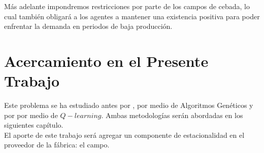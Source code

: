 M\'as adelante impondremos restricciones por parte de los campos de cebada, lo cual tambi\'en obligar\'a a los agentes a mantener una existencia positiva para poder enfrentar la demanda en periodos de baja producci\'on.

\section{Acercamiento en el Presente Trabajo}

Este problema se ha estudiado antes por \citet{Strozzi}, por medio de Algoritmos Genéticos y por \citet{Chaharsooghi} por medio de $Q-learning$. Ambas metodolog\'ias ser\'an abordadas en los siguientes cap\'itulo.\\

El aporte de este trabajo será agregar un componente de estacionalidad en el proveedor de la f\'abrica: el campo.
